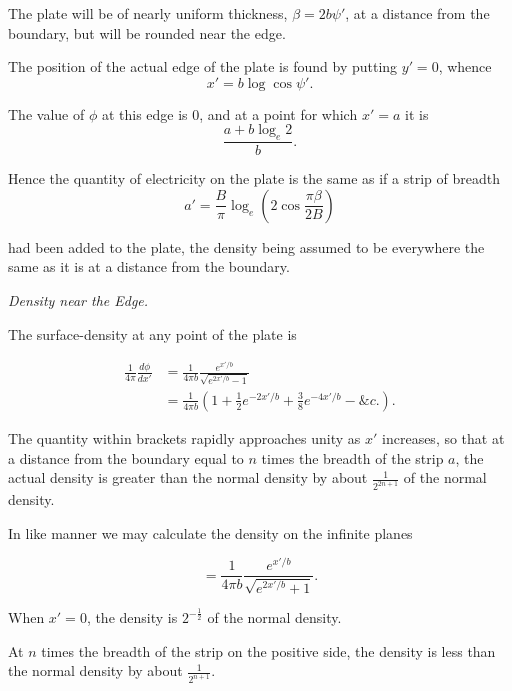 \documentclass[11pt,a4paper]{article}
\begin{document}
The plate will be of nearly uniform thickness, $\beta=2b\psi'$, at a
distance from the boundary, but will be rounded near the edge.

The position of the actual edge of the plate is found by putting
$y'=0$, whence
\begin{equation}\tag{17}
x'=b\log\cos\psi'.
\end{equation}

The value of $\phi$ at this edge is 0, and at a point for which
$x'=a$ it is
\[
\frac{a+b\log_e 2}{b}.
\]

Hence the quantity of electricity on the plate is the same as if a
strip of breadth
\begin{equation}\tag{18}
a'=\frac{B}{\pi}\log_e\left(2\cos\frac{\pi\beta}{2B}\right)
\end{equation}

had been added to the plate, the density being assumed to be everywhere the same as it is at a distance from the boundary.

\begin{center}
\textit{Density near the Edge.}
\end{center}

The surface-density at any point of the plate is

\begin{equation}\tag{19}
\begin{aligned}
\frac{1}{4\pi}\frac{d\phi}{dx'} &=
\frac{1}{4\pi b}\frac{e^{x'/b}}{\sqrt{e^{2x'/b}-1}}\\
&=\frac{1}{4\pi b}\left(1+\frac{1}{2}e^{-2x'/b}
+\frac{3}{8}e^{-4x'/b}-\&c.\right).
\end{aligned}
\end{equation}

The quantity within brackets rapidly approaches unity as $x'$
increases, so that at a distance from the boundary equal to $n$ times
the breadth of the strip $a$, the actual density is greater than the
normal density by about $\frac{1}{2^{2n+1}}$ of the normal density.

In like manner we may calculate the density on the infinite planes

\begin{equation}\tag{20}
=\frac{1}{4\pi b}\frac{e^{x'/b}}{\sqrt{e^{2x'/b}+1}}.
\end{equation}

When $x'=0$, the density is $2^{-\frac{1}{2}}$ of the normal density.

At $n$ times the breadth of the strip on the positive side, the density
is less than the normal density by about $\frac{1}{2^{n+1}}$.
\end{document}
